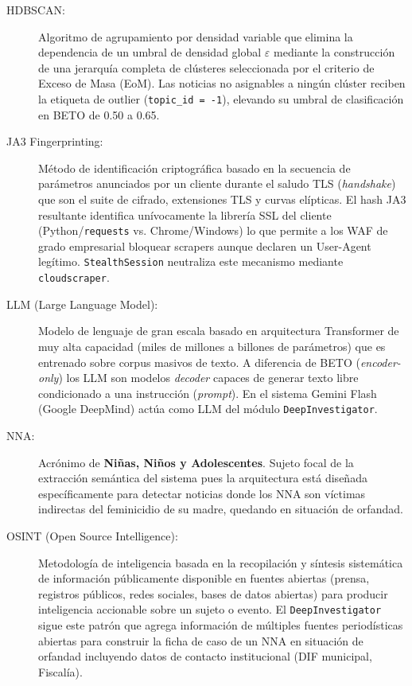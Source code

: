 \begin{description}
    \item[\hypertarget{tHDBSCAN}{HDBSCAN:}]
    Algoritmo de agrupamiento por densidad variable que elimina la
    dependencia de un umbral de densidad global $\varepsilon$ mediante la
    construcción de una jerarquía completa de clústeres seleccionada por el
    criterio de Exceso de Masa (EoM). Las noticias no asignables a ningún
    clúster reciben la etiqueta de outlier (\texttt{topic\_id = -1}),
    elevando su umbral de clasificación en BETO de 0.50 a 0.65.

    \item[\hypertarget{tJA3}{JA3 Fingerprinting:}]
    Método de identificación criptográfica basado en la secuencia de parámetros
    anunciados por un cliente durante el saludo TLS (\textit{handshake}) que son el suite
    de cifrado, extensiones TLS y curvas elípticas. El hash JA3 resultante identifica
    unívocamente la librería SSL del cliente (Python/\texttt{requests} vs.
    Chrome/Windows) lo que permite a los WAF de grado empresarial bloquear scrapers
    aunque declaren un User-Agent legítimo. \texttt{StealthSession} neutraliza
    este mecanismo mediante \texttt{cloudscraper}.

    \item[\hypertarget{tLLM}{LLM (Large Language Model):}]
    Modelo de lenguaje de gran escala basado en arquitectura Transformer de muy alta
    capacidad (miles de millones a billones de parámetros) que es entrenado sobre corpus
    masivos de texto. A diferencia de BETO (\textit{encoder-only}) los LLM son
    modelos \textit{decoder} capaces de generar texto libre condicionado a una
    instrucción (\textit{prompt}). En el sistema Gemini Flash (Google DeepMind)
    actúa como LLM del módulo \texttt{DeepInvestigator}.

    \item[\hypertarget{tNNA}{NNA:}]
    Acrónimo de \textbf{Niñas, Niños y Adolescentes}. Sujeto focal de la extracción
    semántica del sistema pues la arquitectura está diseñada específicamente
    para detectar noticias donde los NNA son víctimas indirectas del feminicidio de
    su madre, quedando en situación de orfandad.

    \item[\hypertarget{tOSINT}{OSINT (Open Source Intelligence):}]
    Metodología de inteligencia basada en la recopilación y síntesis sistemática de
    información públicamente disponible en fuentes abiertas (prensa, registros públicos,
    redes sociales, bases de datos abiertas) para producir inteligencia accionable
    sobre un sujeto o evento. El \texttt{DeepInvestigator} sigue este patrón que agrega
    información de múltiples fuentes periodísticas abiertas para construir la ficha
    de caso de un NNA en situación de orfandad incluyendo datos de contacto
    institucional (DIF municipal, Fiscalía).


\end{description}
